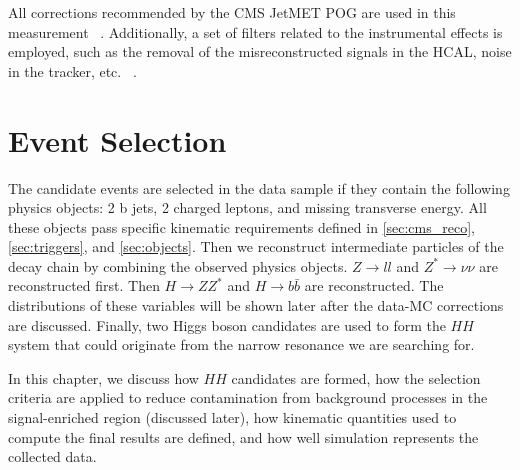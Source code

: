 All corrections recommended by the CMS JetMET POG are used in this measurement ~\cite{MissingETRun2Corrections}. Additionally, a set of filters related to the instrumental effects is employed, such as the removal of the misreconstructed signals in the HCAL, noise in the tracker, etc. ~\cite{MissingETOptionalFiltersRun2}. 

\section{Event Selection}\label{sec:selection}

The candidate events are selected in the data sample if they contain the following physics objects: 2 b jets, 2 charged leptons, and missing transverse energy. All these objects pass specific kinematic requirements defined in \ref{sec:cms_reco}, \ref{sec:triggers}, and \ref{sec:objects}. Then we reconstruct intermediate particles of the decay chain by combining the observed physics objects. $Z \to ll$ and $Z^* \to \nu \nu$ are reconstructed first. Then $H \to ZZ^*$ and $H \to b\bar{b}$ are reconstructed. The distributions of these variables will be shown later after the data-MC corrections are discussed. Finally, two Higgs boson candidates are used to form the $HH$ system that could originate from the narrow resonance we are searching for.

In this chapter, we discuss how $HH$ candidates are formed, how the selection criteria are applied to reduce contamination from background processes in the signal-enriched region (discussed later), how kinematic quantities used to compute the final results are defined, and how well simulation represents the collected data.

